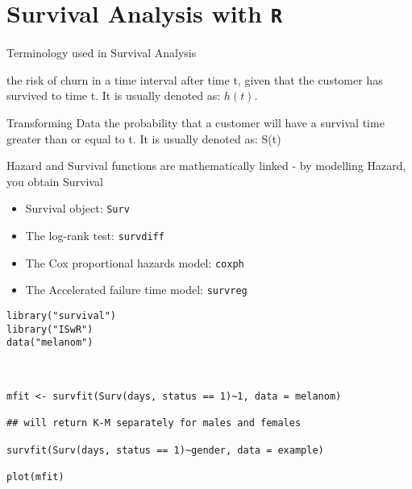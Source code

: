 \documentclass[11pt]{article} %
\begin{document}
\section{Survival Analysis with \texttt{R}}


Terminology used in Survival Analysis

\begin{description}
\item[Hazard Function]
the risk of churn in a time interval after time t, 
given that 
the customer has survived to time t. It is usually denoted as: $h(t)$.

\item[Survival Function]
Transforming Data the probability that a customer will have a survival time greater than or equal to t.
It is usually denoted as: S(t)

\item Hazard and Survival functions are mathematically 
linked - by modelling Hazard, you obtain Survival
\end{description}
\newpage
\begin{itemize}
\item Survival object: \texttt{Surv}
\item The log-rank test: \texttt{survdiff}
\item The Cox proportional hazards model: \texttt{coxph}
\item The Accelerated failure time model: \texttt{survreg}
\end{itemize}

\newpage
\begin{framed}
\begin{verbatim}
library("survival")
library("ISwR") 
data("melanom")



mfit <- survfit(Surv(days, status == 1)~1, data = melanom)

## will return K-M separately for males and females

survfit(Surv(days, status == 1)~gender, data = example) 

plot(mfit)
\end{verbatim}
\end{framed}
\end{document}
